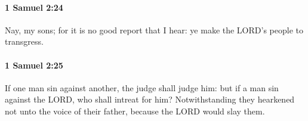 		\paragraph{1 Samuel 2:24} %
			\label{1SAMUEL-2-24}

			Nay, my sons; for it is no good report that I hear: ye make the LORD’s people to transgress.


		\paragraph{1 Samuel 2:25} %
			\label{1SAMUEL-2-25}

			If one man sin against another, the judge shall judge him: but if a man sin against the LORD, who shall intreat for him? Notwithstanding they hearkened not unto the voice of their father, because the LORD would slay them.


